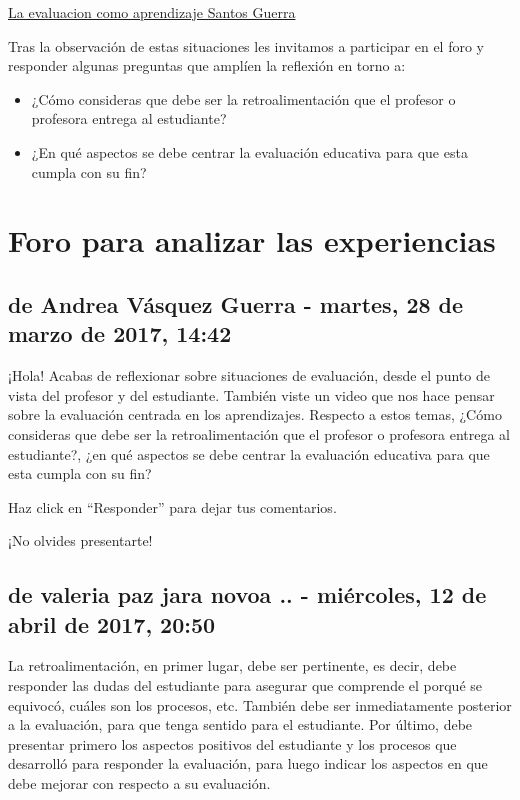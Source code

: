 \documentclass[12pt,letterpaper,article,x11names]{memoir}
\begin{document}
\href{https://youtu.be/zhbM8dzpIYA}{La evaluacion como aprendizaje Santos Guerra}

Tras la observación de estas situaciones les invitamos a participar en el foro y responder algunas preguntas que amplíen la reflexión en torno a:
\begin{itemize}
\item ¿Cómo consideras que debe ser la retroalimentación que el profesor o profesora entrega al estudiante?
\item ¿En qué aspectos se debe centrar la evaluación educativa para que esta cumpla con su fin?
\end{itemize}

\section{Foro para analizar las experiencias}
\label{sec:org2d1f986}
\subsection{de Andrea Vásquez Guerra - martes, 28 de marzo de 2017, 14:42}
\label{sec:orgb5a8eb2}

¡Hola! 
Acabas de reflexionar sobre situaciones de evaluación, desde el punto de vista del profesor y del estudiante. También viste un video que nos hace pensar sobre la evaluación centrada en los aprendizajes. Respecto a estos temas, ¿Cómo consideras que debe ser la retroalimentación que el profesor o profesora entrega al estudiante?, ¿en qué aspectos se debe centrar la evaluación educativa para que esta cumpla con su fin? 

Haz click en “Responder” para dejar tus comentarios. 

¡No olvides presentarte!

\subsection{de valeria paz jara novoa .. - miércoles, 12 de abril de 2017, 20:50}
\label{sec:org185324e}

La retroalimentación, en primer lugar, debe ser pertinente, es decir, debe responder las dudas del estudiante para asegurar que comprende el porqué se equivocó, cuáles son los procesos, etc. También debe ser inmediatamente posterior a la evaluación, para que tenga sentido para el estudiante. Por último, debe presentar primero los aspectos positivos del estudiante y los procesos que desarrolló para responder la evaluación, para luego indicar los aspectos en que debe mejorar con respecto a su evaluación.
\end{document}
